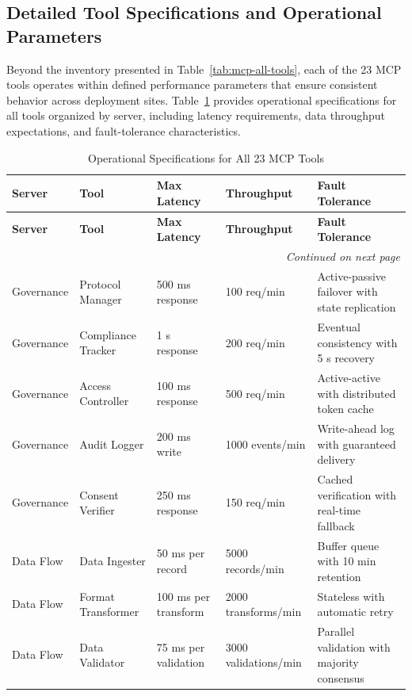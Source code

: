 \subsection{Detailed Tool Specifications and Operational Parameters}
\label{subsec:mcp-tool-specs}

Beyond the inventory presented in Table~\ref{tab:mcp-all-tools}, each of the
23 MCP tools operates within defined performance parameters that ensure
consistent behavior across deployment sites. Table~\ref{tab:mcp-tool-specs}
provides operational specifications for all tools organized by server,
including latency requirements, data throughput expectations, and
fault-tolerance characteristics.

\begin{longtable}{l l p{2.8cm} p{2.2cm} p{3.5cm}}
\caption{Operational Specifications for All 23 MCP Tools}
\label{tab:mcp-tool-specs} \\
\toprule
\textbf{Server} & \textbf{Tool} & \textbf{Max Latency} & \textbf{Throughput} & \textbf{Fault Tolerance} \\
\midrule
\endfirsthead
\toprule
\textbf{Server} & \textbf{Tool} & \textbf{Max Latency} & \textbf{Throughput} & \textbf{Fault Tolerance} \\
\midrule
\endhead
\midrule
\multicolumn{5}{r}{\textit{Continued on next page}} \\
\bottomrule
\endfoot
\bottomrule
\endlastfoot
Governance & Protocol Manager & 500 ms response & 100 req/min & Active-passive failover with state replication \\
Governance & Compliance Tracker & 1 s response & 200 req/min & Eventual consistency with 5 s recovery \\
Governance & Access Controller & 100 ms response & 500 req/min & Active-active with distributed token cache \\
Governance & Audit Logger & 200 ms write & 1000 events/min & Write-ahead log with guaranteed delivery \\
Governance & Consent Verifier & 250 ms response & 150 req/min & Cached verification with real-time fallback \\
\midrule
Data Flow & Data Ingester & 50 ms per record & 5000 records/min & Buffer queue with 10 min retention \\
Data Flow & Format Transformer & 100 ms per transform & 2000 transforms/min & Stateless with automatic retry \\
Data Flow & Data Validator & 75 ms per validation & 3000 validations/min & Parallel validation with majority consensus \\

\end{longtable}
